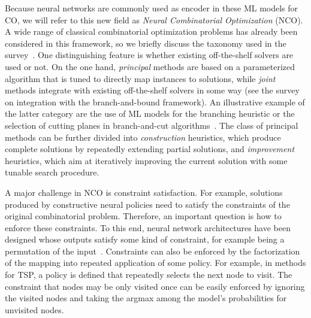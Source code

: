 \documentclass{article}
\theoremstyle{definition}
\theoremstyle{plain}
\begin{document}
Because neural networks are commonly used as encoder in these ML models for CO,
we will refer to this new field as \textit{Neural Combinatorial Optimization} (NCO).
%
A wide range of classical combinatorial optimization problems has already been
considered in this framework, so we briefly discuss the taxonomy used in the
survey~\cite{mazyavkinaReinforcementLearningCombinatorial2020}.
One distinguishing feature is whether existing off-the-shelf solvers are used or
not. On the one hand, \textit{principal} methods are based on a parameterized algorithm
that is tuned to directly map instances to solutions, while \textit{joint} methods
integrate with existing off-the-shelf solvers in some way (see the
survey~\cite{lodiLearningBranchingSurvey2017} on integration with the
branch-and-bound framework). An illustrative example of the latter category are
the use of ML models for the branching heuristic or the selection of cutting
planes in branch-and-cut algorithms~\cite{tangReinforcementLearningInteger2020}.
The class of principal methods can be further divided into \textit{construction}
heuristics, which produce complete solutions by repeatedly extending partial
solutions, and \textit{improvement} heuristics, which aim at iteratively improving the
current solution with some tunable search procedure.




A major challenge in NCO is constraint
satisfaction. For example, solutions produced by constructive neural policies
need to satisfy the constraints of the original combinatorial problem.
Therefore, an important question is how to enforce these constraints. To this
end, neural network architectures have been designed whose outputs satisfy some
kind of constraint, for example being a permutation of the
input~\cite{vinyalsPointerNetworks2017a}. Constraints can also be enforced by
the factorization of the mapping into repeated application of some policy. For
example, in methods for TSP, a policy is defined that repeatedly selects the
next node to visit. The constraint that nodes may be only visited once can be
easily enforced by ignoring the visited nodes and taking the argmax among the
model's probabilities for unvisited nodes.
\end{document}
